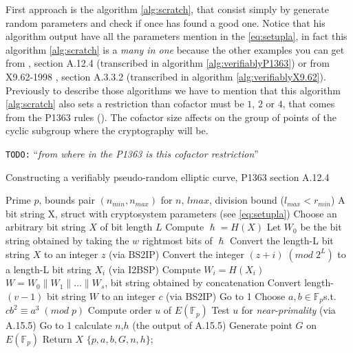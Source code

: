 \documentclass[10pt,a4paper,twoside]{llncs}
\newcommand{\todo}[1]{\texttt{\color{red}TODO:} ``\emph{#1}''}
\newcommand{\Fp}{\ensuremath{\mathbb{F}_p}}%
\newcommand{\EFp}{\ensuremath{E(\mathbb{F}_p)}}%
\begin{document}
First approach is the algorithm \ref{alg:scratch}, that consist simply by generate random parameters and check if once has found a good one. Notice that his algorithm output have all the parameters mention in the \ref{eq:setupla}, in fact this algorithm \ref{alg:scratch} is a \emph{many in one} because the other examples you can get from \cite{P1363}, section A.12.4 (transcribed in algorithm \ref{alg:verifiablyP1363}) or from X9.62-1998 \cite{X9.62-1998}, section A.3.3.2 (transcribed in algorithm \ref{alg:verifiablyX9.62}). Previously to describe those algorithms we have to mention that this algorithm \ref{alg:scratch} also sets a restriction than cofactor must be $1$, $2$ or $4$, that comes from the P1363 rules (\cite{P1363}). The cofactor size affects on the group of points of the cyclic subgroup where the cryptography will be.

\todo{from where in the P1363 is this cofactor restriction}

\begin{algorithm}
  \caption{Constructing a verifiably pseudo-random elliptic curve, P1363 section A.12.4}\label{alg:verifiablyP1363}
  \begin{algorithmic}[1]
    \REQUIRE Prime $p$, bounds pair $(n_{min},n_{max})$ for $n$, $l{max}$, division bound ($l_{max}<r_{min}$)
    \ENSURE A bit string X, struct with cryptosystem parameters (see \ref{eq:setupla})
    \STATE Choose an arbitrary bit string $X$ of bit length $L$
    \STATE Compute $\hslash=H(X)$
    \STATE Let $W_0$ be the bit string obtained by taking the $w$ rightmost bits of $\hslash$
    \STATE Convert the length-L bit string $X$ to an integer $z$ (via BS2IP)
      \STATE Convert the integer $(z+i)\;(mod\;2^L)$ to a length-L bit string $X_i$ (via I2BSP)
      \STATE Compute $W_i=H(X_i)$
    \ENDFOR
    \STATE $W=W_0\|W_1\|\ldots\|W_s$, bit string obtained by concatenation
    \STATE Convert length-$(v-1)$ bit string $W$ to an integer $c$ (via BS2IP)
      \STATE Go to 1
    \ENDIF
    \STATE Choose $a,b\in$\Fp \;s.t. $cb^2\equiv a^3\;(mod\;p)$
    \STATE Compute order $u$ of \EFp
    \STATE Test $u$ for \emph{near-primality} (via A.15.5)
      \STATE Go to 1
    \ELSE
      \STATE calculate $n$,$h$ (the output of A.15.5)
    \ENDIF
    \STATE Generate point $G$ on \EFp
    \STATE Return $X$ \AND $\{p,a,b,G,n,h\}$;
  \end{algorithmic}
\end{algorithm}
\end{document}
